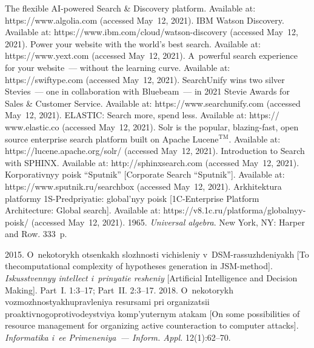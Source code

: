   \begin{multicols}{2}

\renewcommand{\bibname}{\protect\rmfamily References}

{\small\frenchspacing
 {%
 \begin{thebibliography}{99}
The flexible AI-powered Search \& Discovery platform. Available at: 
{\sf https://www.algolia.com} (accessed May~12, 2021).
IBM Watson Discovery. Available at: {\sf https://www.ibm.\linebreak com/cloud/watson-discovery}
(accessed May~12, 2021).
Power your website with the world's best search. Available at: {\sf https://www.yext.com} 
(accessed May~12, 2021).
A~powerful search experience for your website~--- without the learning curve. Available at: 
{\sf https://swiftype.com} (accessed May~12, 2021).
SearchUnify wins two silver Stevies~--- one in collaboration with Bluebeam~--- in 2021 Stevie 
Awards for Sales \& Customer Service. Available at: {\sf https://www.\linebreak searchunify.com} (accessed May~12, 2021).
ELASTIC: Search more, spend less. Available at: {\sf https:// www.elastic.co} (accessed May~12, 
2021).
Solr is the popular, blazing-fast, open source enterprise search platform built on Apache 
Lucene$^{\mathrm{TM}}$. Available at: {\sf https://lucene.apache.org/solr/} (accessed May~12, 2021).
Introduction to Search with SPHINX. Available at: {\sf http://sphinxsearch.com} (accessed May~12, 2021). 
Korporativnyy poisk ``Sputnik'' [Corporate Search ``Sputnik'']. Available at: 
{\sf https://www.sputnik.ru/searchbox} (accessed May~12, 2021).
Arkhitektura platformy 1S-Predpriyatie: global'nyy poisk [1C-Enterprise Platform 
Architecture: Global search]. Available at: {\sf https://v8.1c.ru/platforma/globalnyy-poisk/} (accessed 
May~12, 2021). 
 1965. \textit{Universal algebra}. New York, NY: \mbox{Harper} and Row. 333~p.

 2015. O~nekotorykh otsenkakh slozhnosti vichisleniy 
v~DSM-rassuzhdeniyakh [To the\linebreak computational complexity of hypotheses generation in JSM-method]. 
\textit{Iskusstvennyy intellect i~prinyatie resheniy} [\mbox{Artificial} Intelligence and Decision Making]. Part~I. 
1:\mbox{3--17}; Part~II. 2:3--17.
 2018. O~nekotorykh 
voz\-mozh\-no\-styakh\linebreak uprav\-le\-niya resursami pri organizatsii proaktivnogo\linebreak pro\-ti\-vo\-deystviya 
komp'yuternym atakam [On some possibilities of resource management for organizing active 
counteraction to computer attacks]. \textit{Informatika i~ee Pri\-me\-ne\-niya~--- Inform. Appl.} 12(1):62--70.


\end{thebibliography}}}
\end{multicols}
